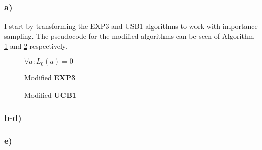\documentclass[a4paper]{article}
\begin{document}
\subsection{}
\label{subsec:22}
\subsubsection*{a)}
I start by transforming the EXP3 and USB1 algorithms to work with importance
sampling.
The pseudocode for the modified algorithms can be seen of Algorithm \ref{algo1}
and \ref{algo2} respectively.
\begin{figure}[ht]
\begin{algorithm}[H]
 \caption{Modified \textbf{EXP3}}
 \label{algo1}
 \DontPrintSemicolon
 $\forall a: L_0(a) = 0$\;
\end{algorithm}
\end{figure}

\begin{figure}[ht]
\begin{algorithm}[H]
 \caption{Modified \textbf{UCB1}}
 \label{algo2}
 \DontPrintSemicolon
\end{algorithm}
\end{figure}

\subsubsection*{b-d)}

\subsubsection*{e)}
\end{document}
